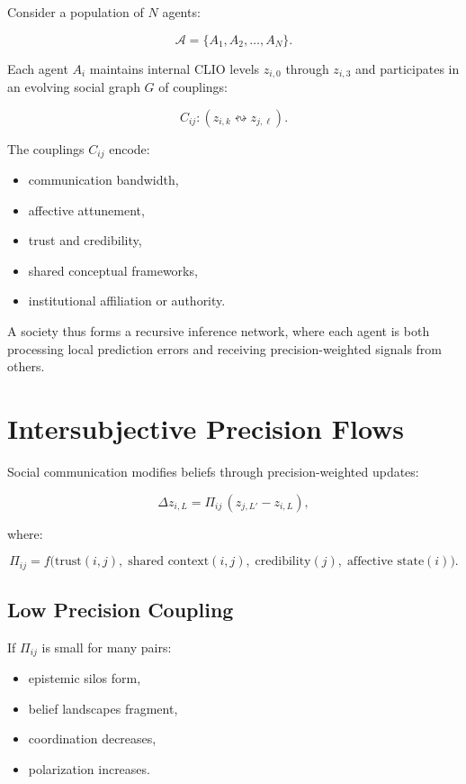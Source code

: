 \documentclass[12pt,oneside]{book}
\theoremstyle{plain}
\theoremstyle{definition}
\begin{document}
Consider a population of $N$ agents:

\[
\mathcal{A} = \{ A_1, A_2, \dots, A_N \}.
\]

Each agent $A_i$ maintains internal CLIO levels $z_{i,0}$ through $z_{i,3}$ and 
participates in an evolving social graph $G$ of couplings:

\[
C_{ij} : (z_{i,k} \leftrightsquigarrow z_{j,\ell}).
\]

The couplings $C_{ij}$ encode:

\begin{itemize}
    \item communication bandwidth,
    \item affective attunement,
    \item trust and credibility,
    \item shared conceptual frameworks,
    \item institutional affiliation or authority.
\end{itemize}

A society thus forms a recursive inference network, where each agent is both 
processing local prediction errors and receiving precision-weighted signals from 
others.

\section{Intersubjective Precision Flows}

Social communication modifies beliefs through precision-weighted updates:

\[
\Delta z_{i,L}
=
\Pi_{ij}\, ( z_{j,L'} - z_{i,L} ),
\]

where:

\[
\Pi_{ij}
=
f\bigl(
\text{trust}(i,j),
\;
\text{shared context}(i,j),
\;
\text{credibility}(j),
\;
\text{affective state}(i)
\bigr).
\]

\subsection{Low Precision Coupling}

If $\Pi_{ij}$ is small for many pairs:

\begin{itemize}
    \item epistemic silos form,
    \item belief landscapes fragment,
    \item coordination decreases,
    \item polarization increases.
\end{itemize}
\end{document}
